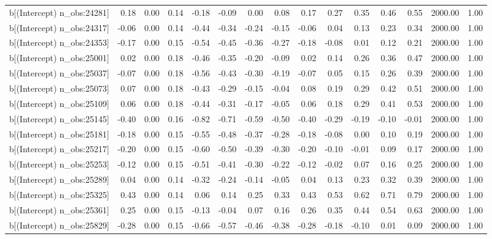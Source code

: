 \begin{table}[ht]
\begin{tabular}{rrrrrrrrrrrrrrr}
  b[(Intercept) n\_obs:24281] & 0.18 & 0.00 & 0.14 & -0.18 & -0.09 & 0.00 & 0.08 & 0.17 & 0.27 & 0.35 & 0.46 & 0.55 & 2000.00 & 1.00 \\ 
  b[(Intercept) n\_obs:24317] & -0.06 & 0.00 & 0.14 & -0.44 & -0.34 & -0.24 & -0.15 & -0.06 & 0.04 & 0.13 & 0.23 & 0.34 & 2000.00 & 1.00 \\ 
  b[(Intercept) n\_obs:24353] & -0.17 & 0.00 & 0.15 & -0.54 & -0.45 & -0.36 & -0.27 & -0.18 & -0.08 & 0.01 & 0.12 & 0.21 & 2000.00 & 1.00 \\ 
  b[(Intercept) n\_obs:25001] & 0.02 & 0.00 & 0.18 & -0.46 & -0.35 & -0.20 & -0.09 & 0.02 & 0.14 & 0.26 & 0.36 & 0.47 & 2000.00 & 1.00 \\ 
  b[(Intercept) n\_obs:25037] & -0.07 & 0.00 & 0.18 & -0.56 & -0.43 & -0.30 & -0.19 & -0.07 & 0.05 & 0.15 & 0.26 & 0.39 & 2000.00 & 1.00 \\ 
  b[(Intercept) n\_obs:25073] & 0.07 & 0.00 & 0.18 & -0.43 & -0.29 & -0.15 & -0.04 & 0.08 & 0.19 & 0.29 & 0.42 & 0.51 & 2000.00 & 1.00 \\ 
  b[(Intercept) n\_obs:25109] & 0.06 & 0.00 & 0.18 & -0.44 & -0.31 & -0.17 & -0.05 & 0.06 & 0.18 & 0.29 & 0.41 & 0.53 & 2000.00 & 1.00 \\ 
  b[(Intercept) n\_obs:25145] & -0.40 & 0.00 & 0.16 & -0.82 & -0.71 & -0.59 & -0.50 & -0.40 & -0.29 & -0.19 & -0.10 & -0.01 & 2000.00 & 1.00 \\ 
  b[(Intercept) n\_obs:25181] & -0.18 & 0.00 & 0.15 & -0.55 & -0.48 & -0.37 & -0.28 & -0.18 & -0.08 & 0.00 & 0.10 & 0.19 & 2000.00 & 1.00 \\ 
  b[(Intercept) n\_obs:25217] & -0.20 & 0.00 & 0.15 & -0.60 & -0.50 & -0.39 & -0.30 & -0.20 & -0.10 & -0.01 & 0.09 & 0.17 & 2000.00 & 1.00 \\ 
  b[(Intercept) n\_obs:25253] & -0.12 & 0.00 & 0.15 & -0.51 & -0.41 & -0.30 & -0.22 & -0.12 & -0.02 & 0.07 & 0.16 & 0.25 & 2000.00 & 1.00 \\ 
  b[(Intercept) n\_obs:25289] & 0.04 & 0.00 & 0.14 & -0.32 & -0.24 & -0.14 & -0.05 & 0.04 & 0.13 & 0.23 & 0.32 & 0.39 & 2000.00 & 1.00 \\ 
  b[(Intercept) n\_obs:25325] & 0.43 & 0.00 & 0.14 & 0.06 & 0.14 & 0.25 & 0.33 & 0.43 & 0.53 & 0.62 & 0.71 & 0.79 & 2000.00 & 1.00 \\ 
  b[(Intercept) n\_obs:25361] & 0.25 & 0.00 & 0.15 & -0.13 & -0.04 & 0.07 & 0.16 & 0.26 & 0.35 & 0.44 & 0.54 & 0.63 & 2000.00 & 1.00 \\ 
  b[(Intercept) n\_obs:25829] & -0.28 & 0.00 & 0.15 & -0.66 & -0.57 & -0.46 & -0.38 & -0.28 & -0.18 & -0.10 & 0.01 & 0.09 & 2000.00 & 1.00 \\ 

\end{tabular}
\end{table}
